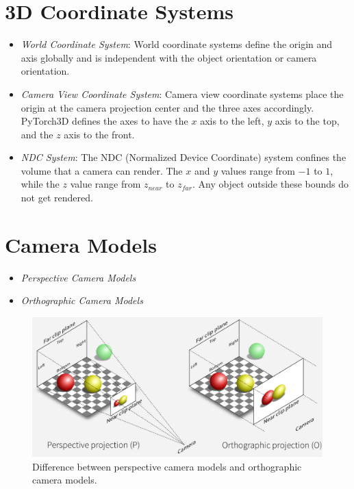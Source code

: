 \section{3D Coordinate Systems}
\begin{itemize}
    \item{
        \emph{World Coordinate System}:
        World coordinate systems define the origin and axis globally
        and is independent with the object orientation or camera orientation.
    }
    \item{
        \emph{Camera View Coordinate System}:
        Camera view coordinate systems place the origin at the camera projection
        center and the three axes accordingly. PyTorch3D defines the axes to have
        the $x$ axis to the left, $y$ axis to the top, and the $z$ axis to the front.
    }
    \item{
        \emph{NDC System}:
        The NDC (Normalized Device Coordinate) system confines the volume that
        a camera can render. The $x$ and $y$ values range from $-1$ to $1$, while
        the $z$ value range from $z_{near}$ to $z_{far}$. Any object outside these
        bounds do not get rendered.
    }
\end{itemize}

\section{Camera Models}
\begin{itemize}
    \item{ \emph{Perspective Camera Models} }
    \item{ \emph{Orthographic Camera Models} }
\end{itemize}
\begin{figure}[ht]
  \centering
   \includegraphics[width=0.8\linewidth]{./figures/ch1-camera-models.jpeg}
   \caption{Difference between perspective camera models and orthographic camera models.}
\end{figure}


